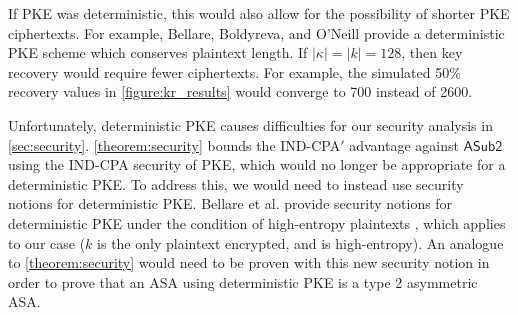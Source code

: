 If \textsf{PKE} was deterministic, this would also allow for the possibility of shorter \textsf{PKE} ciphertexts. For example, Bellare, Boldyreva, and O'Neill provide a deterministic PKE scheme which conserves plaintext length. If $|\kappa|=|k|=128$, then key recovery would require fewer ciphertexts. For example, the simulated 50\% recovery values in \autoref{figure:kr_results} would converge to 700 instead of 2600.

Unfortunately, deterministic \textsf{PKE} causes difficulties for our security analysis in \autoref{sec:security}. \autoref{theorem:security} bounds the IND-CPA$'$ advantage against $\mathsf{ASub2}$ using the IND-CPA security of \textsf{PKE}, which would no longer be appropriate for a deterministic \textsf{PKE}. To address this, we would need to instead use security notions for deterministic \textsf{PKE}. Bellare et al. provide security notions for deterministic PKE under the condition of high-entropy plaintexts \cite{C:BelBolONe07}, which applies to our case ($k$ is the only plaintext encrypted, and is high-entropy). An analogue to \autoref{theorem:security} would need to be proven with this new security notion in order to prove that an ASA using deterministic PKE is a type 2 asymmetric ASA.
